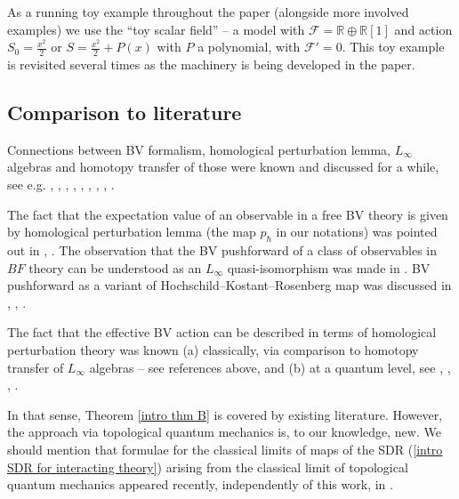 \documentclass{amsart}
\theoremstyle{plain} %
\theoremstyle{definition}
\theoremstyle{remark}
\newcommand{\bl}{\color{blue}}
\newcommand{\F}{\mathcal{F}}
\newcommand{\RR}{\mathbb{R}}
\begin{document}
As a running toy example throughout the paper (alongside more involved examples) we use the ``toy scalar field'' -- a model with $\F=\RR\oplus \RR[1]$ and action $S_0=\frac{x^2}{2}$ or $S=\frac{x^2}{2}+P(x)$ with $P$ a polynomial, with $\F'=0$. This toy example is revisited several times as the machinery is being developed in the paper.

\subsection{Comparison to literature}
Connections between BV formalism, homological perturbation lemma, $L_\infty$ algebras and homotopy transfer of those were 
known and discussed for a while, %
see e.g. \cite{HS}, \cite{Losev_GAP}, \cite{KL}, \cite{simpBF}, \cite{discrBF}, \cite{Losev}, \cite{DJP}, \cite{MSW}, \cite{JMSW}.

The fact that the expectation value of an observable in a free BV theory is given by homological perturbation lemma (the map $p_\hbar$ in our notations) was pointed out in \cite{Gwilliam}, \cite{GJF}. The observation that the BV pushforward of a class of observables in $BF$ theory can be understood as an $L_\infty$ quasi-isomorphism was made in \cite[Theorem 2]{simpBF}.
BV pushforward as a variant of Hochschild--Kostant--Rosenberg map was discussed in \cite{GLX}, \cite{GL2}, \cite{SiLi}.

The fact that the effective BV action can be described in terms of homological perturbation theory was known (a) classically, via comparison to homotopy transfer of $L_\infty$ algebras -- see references above, and (b) at a quantum level, %
see \cite{Jurco}, \cite{SS}, \cite{DJP}, \cite{JMSW}.

In that sense, Theorem \ref{intro thm B} is %
covered by existing literature. However, the approach via topological quantum mechanics is, to our knowledge, new. We should mention that formulae for the classical limits of maps of the SDR (\ref{intro SDR for interacting theory}) arising from the classical limit of topological quantum mechanics appeared recently, independently of this work, in \cite{Getzler_talk}.
\end{document}
